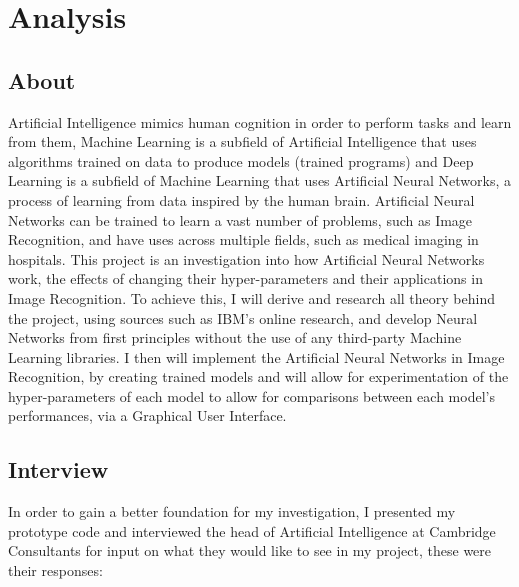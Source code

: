 \documentclass[./project-report/src/latex/project-report.tex]{subfiles}
\begin{document}
\maketitle

\section{Analysis}

\subsection{About}

Artificial Intelligence mimics human cognition in order to perform tasks and learn from them, Machine Learning is a subfield of Artificial Intelligence that uses 
algorithms trained on data to produce models (trained programs) and Deep Learning is a subfield of Machine Learning that uses Artificial Neural Networks, a process of 
learning from data inspired by the human brain. Artificial Neural Networks can be trained to learn a vast number of problems, such as Image Recognition, and have uses 
across multiple fields, such as medical imaging in hospitals. This project is an investigation into how Artificial Neural Networks work, the effects of changing their 
hyper-parameters and their applications in Image Recognition. To achieve this, I will derive and research all theory behind the project, using sources such as IBM's online 
research, and develop Neural Networks from first principles without the use of any third-party Machine Learning libraries. I then will implement the Artificial Neural 
Networks in Image Recognition, by creating trained models and will allow for experimentation of the hyper-parameters of each model to allow for comparisons between each 
model's performances, via a Graphical User Interface.

\subsection{Interview}

In order to gain a better foundation for my investigation, I presented my prototype code and interviewed the head of Artificial Intelligence at Cambridge Consultants 
for input on what they would like to see in my project, these were their responses:
\end{document}
